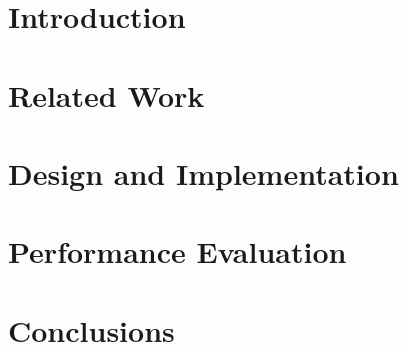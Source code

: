 \documentclass[12pt]{article}
\begin{document}
\begin{CJK}{UTF8}{bkai}
\doublespacing


\section{Introduction}


\section{Related Work}

\section{Design and Implementation}

\section{Performance Evaluation}

\section{Conclusions}

\clearpage

\singlespacing

\printbibliography

\end{CJK}
\end{document}

